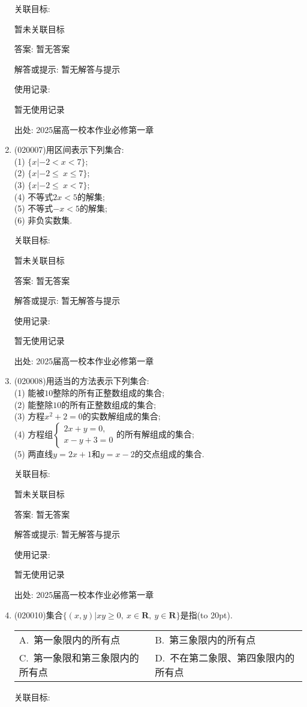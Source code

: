 \documentclass[10pt,a4paper]{article}
\newcommand{\bracket}[1]{(\hbox to #1pt{})}
\newcommand{\twoch}[4]{\par\begin{tabular}{p{.46\textwidth}p{.46\textwidth}}
A.~#1& B.~#2\\
C.~#3& D.~#4
\end{tabular}}
\begin{document}
\begin{enumerate}[1.]
关联目标:

暂未关联目标

答案: 暂无答案

解答或提示: 暂无解答与提示

使用记录:

暂无使用记录


出处: 2025届高一校本作业必修第一章
\item { (020007)}用区间表示下列集合:\\
(1) $\{x|-2<x<7\}$;\\
(2) $\{x|-2\le\ x\le7\}$;\\
(3) $\{x|-2\le\ x<7\}$;\\
(4) 不等式$2x<5$的解集;\\
(5) 不等式$-x<5$的解集; \\
(6) 非负实数集.


关联目标:

暂未关联目标

答案: 暂无答案

解答或提示: 暂无解答与提示

使用记录:

暂无使用记录


出处: 2025届高一校本作业必修第一章
\item { (020008)}用适当的方法表示下列集合:\\
(1) 能被$10$整除的所有正整数组成的集合;\\
(2) 能整除$10$的所有正整数组成的集合;\\
(3) 方程$x^2+2=0$的实数解组成的集合;\\
(4) 方程组$\begin{cases}2x+y=0, \\ x-y+3=0\end{cases}$的所有解组成的集合;\\
(5) 两直线$y=2x+1$和$y=x-2$的交点组成的集合.


关联目标:

暂未关联目标

答案: 暂无答案

解答或提示: 暂无解答与提示

使用记录:

暂无使用记录


出处: 2025届高一校本作业必修第一章
\item { (020010)}集合$\{(x, y)|xy\ge 0,\  x\in\mathbf{R},\  y\in\mathbf{R}\}$是指\bracket{20}.
\twoch{第一象限内的所有点}{第三象限内的所有点}{第一象限和第三象限内的所有点}{不在第二象限、第四象限内的所有点}


关联目标:


\end{enumerate}
\end{document}
